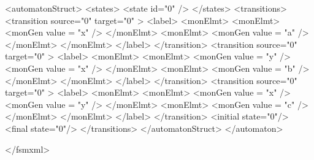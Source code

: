 {\footnotesize
\begin{listingcont}
  <automatonStruct>
    <states>
      <state  id="0" />
    </states>
    <transitions>
      <transition  source="0"  target="0" >
        <label>
	  <monElmt>
	    <monElmt>
	      <monGen  value = "x" />
	    </monElmt>
	    <monElmt>
	      <monGen  value = "a" />
	    </monElmt>
	  </monElmt>
        </label>
      </transition>
      <transition  source="0"  target="0" >
        <label>
	  <monElmt>
	    <monElmt>
	      <monGen  value = "y" />
	      <monGen  value = "x" />
	    </monElmt>
	    <monElmt>
	      <monGen  value = "b" />
	    </monElmt>
	  </monElmt>
        </label>
      </transition>
      <transition  source="0"  target="0" >
        <label>
	  <monElmt>
	    <monElmt>
	      <monGen  value = "x" />
	      <monGen  value = "y" />
	    </monElmt>
	    <monElmt>
	      <monGen  value = "c" />
	    </monElmt>
	  </monElmt>
        </label>
      </transition>
      <initial state="0"/>
      <final   state="0"/>
    </transitions>
  </automatonStruct>
</automaton>

</fsmxml>
\end{listingcont}
}

\clearpage
